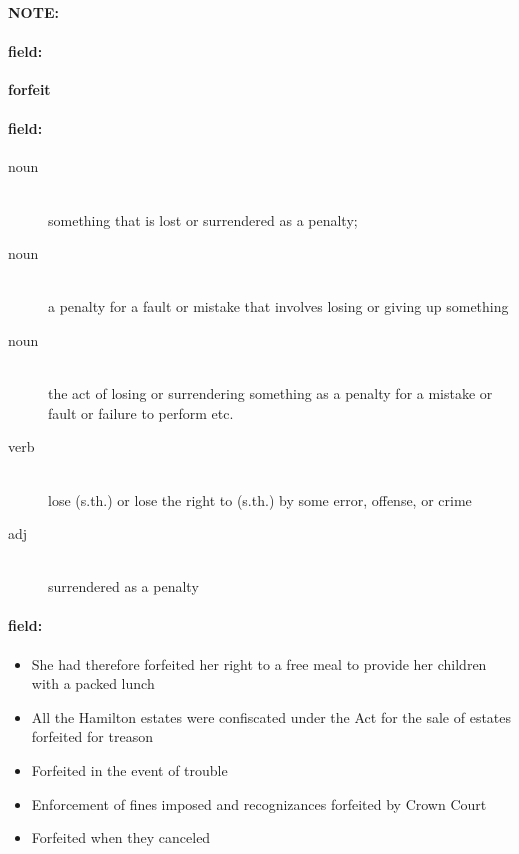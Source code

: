 \documentclass[12pt]{article}
\newenvironment{note}{\paragraph{NOTE:}}{}
\newenvironment{field}{\paragraph{field:}}{}
\begin{document}
\begin{note}
\begin{field}
\textbf{\large forfeit}
\end{field}


\begin{field}
\begin{description}
\item[noun] \hfill \\ 
something that is lost or surrendered as a penalty; 

\item[noun] \hfill \\ 
a penalty for a fault or mistake that involves losing or giving up something

\item[noun] \hfill \\ 
the act of losing or surrendering something as a penalty for a mistake or fault or failure to perform etc.

\item[verb] \hfill \\ 
lose (s.th.) or lose the right to (s.th.) by some error, offense, or crime

\item[adj] \hfill \\ 
surrendered as a penalty

\end{description}
\end{field}

\begin{field}
\begin{itemize}
\item She had therefore forfeited her right to a free meal to provide her children with a packed lunch
\item All the Hamilton estates were confiscated under the Act for the sale of estates forfeited for treason
\item Forfeited in the event of trouble
\item Enforcement of fines imposed and recognizances forfeited by Crown Court
\item Forfeited when they canceled
\end{itemize}
\end{field}
\end{note}
\end{document}
